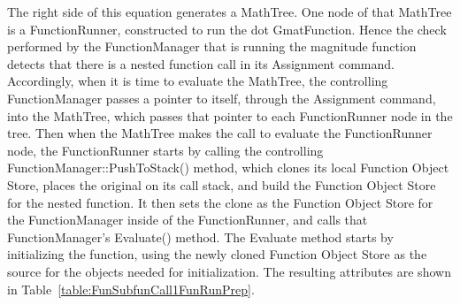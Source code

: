 \noindent The right side of this equation generates a MathTree.  One node of that MathTree is a
FunctionRunner, constructed to run the dot GmatFunction.  Hence the check performed by the
FunctionManager that is running the magnitude function detects that there is a nested function call
in its Assignment command.  Accordingly, when it is time to evaluate the MathTree, the controlling
FunctionManager passes a pointer to itself, through the Assignment command, into the MathTree, which
passes that pointer to each FunctionRunner node in the tree.  Then when the MathTree makes the call
to evaluate the FunctionRunner node, the FunctionRunner starts by calling the controlling
FunctionManager::\-PushToStack() method, which clones its local Function Object Store, places the
original on its call stack, and build the Function Object Store for the nested function.  It then
sets the clone as the Function Object Store for the FunctionManager inside of the FunctionRunner,
and calls that FunctionManager's Evaluate() method.  The Evaluate method starts by initializing the
function, using the newly cloned Function Object Store as the source for the objects needed for
initialization.  The resulting attributes are shown in Table~\ref{table:FunSubfunCall1FunRunPrep}.

